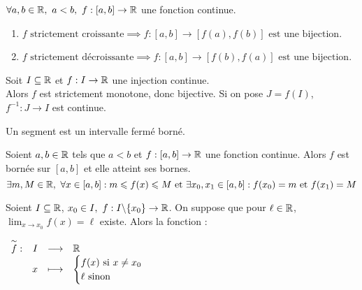 \begin{theorem}
	$\forall a, b \in \mathbb{R},\ a < b,\ f : [a, b] \to \mathbb{R}$ une fonction continue.
	\begin{enumerate}
	    \item $ f \text{ strictement croissante} \implies f : [a, b] \to [f(a), f(b)] \text{ est une bijection} $.
            \item $ f \text{ strictement décroissante} \implies f : [a, b] \to [f(b), f(a)] \text{ est une bijection} $.
	\end{enumerate}
\end{theorem}

\begin{theorem}
	Soit $I \subseteq \mathbb{R}$ et $f : I \to \mathbb{R}$ une injection continue.
	\\
	Alors $f$ est strictement monotone, donc bijective. Si on pose $J = f(I)$, $f^{-1} : J \to I$ est continue.
\end{theorem}

\begin{definition}[Segment]
	Un segment est un intervalle fermé borné.
\end{definition}

\begin{theorem}
	Soient $a, b \in \mathbb{R}$ tels que $a < b$ et $f : [a, b] \to \mathbb{R}$ une fonction continue. Alors $f$ est bornée sur $[a, b]$ et elle atteint ses bornes.
	\[ \exists m, M \in \mathbb{R},\ \forall x \in [a, b] : m \leqslant f(x) \leqslant M \text{ et } \exists x_0, x_1 \in [a, b] : f(x_0) = m \text{ et } f(x_1) = M \]
\end{theorem}

\begin{definition}
	Soient $I \subseteq \mathbb{R}$, $x_0 \in I,\ f : I\backslash\{x_0\} \to \mathbb{R}$.
	On suppose que pour $\ell \in \mathbb{R}$, $\lim_{x \to x_0} f(x) = \ell$ existe. Alors la fonction :
	\begin{center}
		$
		\begin{array}{rrcl} \overset{\sim}{f} : & I & \longrightarrow & \mathbb{R} \\ & x & \longmapsto & 
		\begin{cases}
			f(x) \text{ si } x \neq x_0 \\
			\ell \text{ sinon}
		\end{cases}		
		 \end{array}
		$
	\end{center}
\end{definition}
